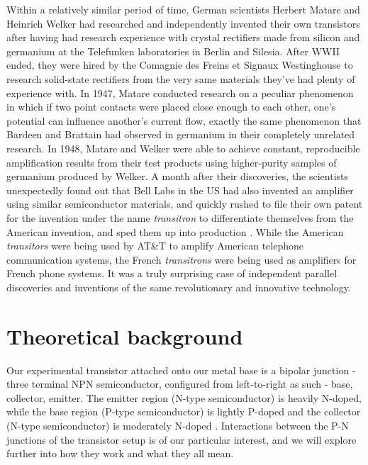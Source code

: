 \documentclass[10pt,letterpaper,onecolumn]{article}
\begin{document}
Within a relatively similar period of time, German scientists Herbert Matare and Heinrich Welker had researched and independently invented their own transistors after having had research experience with crystal rectifiers made from silicon and germanium at the Telefunken laboratories in Berlin and Silesia. After WWII ended, they were hired by the Comagnie des Freins et Signaux Westinghouse to research solid-state rectifiers from the very same materials they've had plenty of experience with. In 1947, Matare conducted research on a peculiar phenomenon in which if two point contacts were placed close enough to each other, one's potential can influence another's current flow, exactly the same phenomenon that Bardeen and Brattain had observed in germanium in their completely unrelated research. In 1948, Matare and Welker were able to achieve constant, reproducible amplification results from their test products using higher-purity samples of germanium produced by Welker. A month after their discoveries, the scientists unexpectedly found out that Bell Labs in the US had also invented an amplifier using similar semiconductor materials, and quickly rushed to file their own patent for the invention under the name {\it transitron} to differentiate themselves from the American invention, and sped them up into production \cite{matare}. While the American {\it transitors} were being used by AT\&T to amplify American telephone communication systems, the French {\it transitrons} were being used as amplifiers for French phone systems. It was a truly surprising case of independent parallel discoveries and inventions of the same revolutionary and innovative technology.






\section{Theoretical background}

Our experimental transistor attached onto our metal base is a bipolar junction - three terminal NPN semiconductor, configured from left-to-right as such - base, collector, emitter. The emitter region (N-type semiconductor) is heavily N-doped, while the base region (P-type semiconductor) is lightly P-doped and the collector (N-type semiconductor) is moderately N-doped \cite{exp11}. Interactions between the P-N junctions of the transistor setup is of our particular interest, and we will explore further into how they work and what they all mean.
\end{document}
